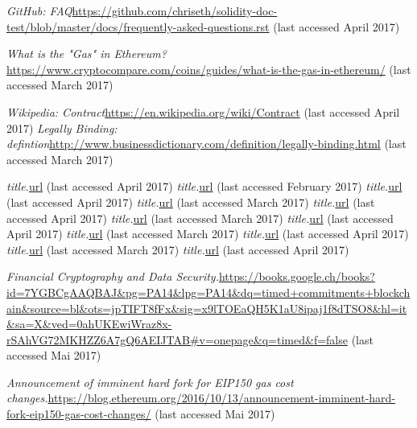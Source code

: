 \begin{thebibliography}{99}
\emph{GitHub: FAQ}\url{https://github.com/chriseth/solidity-doc-test/blob/master/docs/frequently-asked-questions.rst} (last accessed April 2017)




\emph{What is the "Gas" in Ethereum?}\url{https://www.cryptocompare.com/coins/guides/what-is-the-gas-in-ethereum/} (last accessed March 2017)

\emph{Wikipedia: Contract}\url{https://en.wikipedia.org/wiki/Contract} (last accessed April 2017)
\emph{Legally Binding: defintion}\url{http://www.businessdictionary.com/definition/legally-binding.html} (last accessed March 2017)

\emph{title.}\url{url} (last accessed April 2017)
\emph{title.}\url{url} (last accessed February 2017)
\emph{title.}\url{url} (last accessed April 2017)
\emph{title.}\url{url} (last accessed March 2017)
\emph{title.}\url{url} (last accessed April 2017)
\emph{title.}\url{url} (last accessed March 2017)
\emph{title.}\url{url} (last accessed April 2017)
\emph{title.}\url{url} (last accessed March 2017)
\emph{title.}\url{url} (last accessed April 2017)
\emph{title.}\url{url} (last accessed March 2017)
\emph{title.}\url{url} (last accessed April 2017)



\emph{Financial Cryptography and Data Security.}\url{https://books.google.ch/books?id=7YGBCgAAQBAJ&pg=PA14&lpg=PA14&dq=timed+commitments+blockchain&source=bl&ots=jpTIFT8fFx&sig=x9lTOEaQH5K1aU8ipaj1f8dTSO8&hl=it&sa=X&ved=0ahUKEwiWraz8x-rSAhVG72MKHZZ6A7gQ6AEIJTAB#v=onepage&q=timed&f=false} (last accessed Mai 2017)


\emph{Announcement of imminent hard fork for EIP150 gas cost changes.}\url{https://blog.ethereum.org/2016/10/13/announcement-imminent-hard-
fork-eip150-gas-cost-changes/} (last accessed Mai 2017)









\end{thebibliography}
